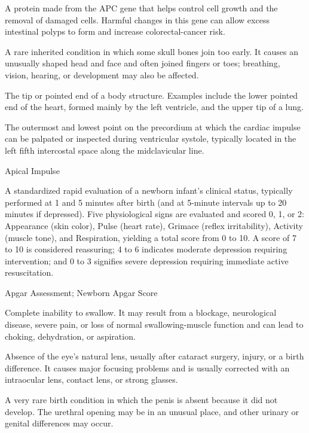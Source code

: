  A protein made from the APC gene that helps control cell growth and the removal of damaged cells. Harmful changes in this gene can allow excess intestinal polyps to form and increase colorectal-cancer risk.

 A rare inherited condition in which some skull bones join too early. It causes an unusually shaped head and face and often joined fingers or toes; breathing, vision, hearing, or development may also be affected.

 The tip or pointed end of a body structure. Examples include the lower pointed end of the heart, formed mainly by the left ventricle, and the upper tip of a lung.

 The outermost and lowest point on the precordium at which the cardiac impulse can be palpated or inspected during ventricular systole, typically located in the left fifth intercostal space along the midclavicular line.

\synonyms
Apical Impulse

 A standardized rapid evaluation of a newborn infant's clinical status, typically performed at 1 and 5 minutes after birth (and at 5-minute intervals up to 20 minutes if depressed). Five physiological signs are evaluated and scored 0, 1, or 2: Appearance (skin color), Pulse (heart rate), Grimace (reflex irritability), Activity (muscle tone), and Respiration, yielding a total score from 0 to 10. A score of 7 to 10 is considered reassuring; 4 to 6 indicates moderate depression requiring intervention; and 0 to 3 signifies severe depression requiring immediate active resuscitation.

\synonyms
Apgar Assessment; Newborn Apgar Score

 Complete inability to swallow. It may result from a blockage, neurological disease, severe pain, or loss of normal swallowing-muscle function and can lead to choking, dehydration, or aspiration.

 Absence of the eye’s natural lens, usually after cataract surgery, injury, or a birth difference. It causes major focusing problems and is usually corrected with an intraocular lens, contact lens, or strong glasses.

 A very rare birth condition in which the penis is absent because it did not develop. The urethral opening may be in an unusual place, and other urinary or genital differences may occur.

